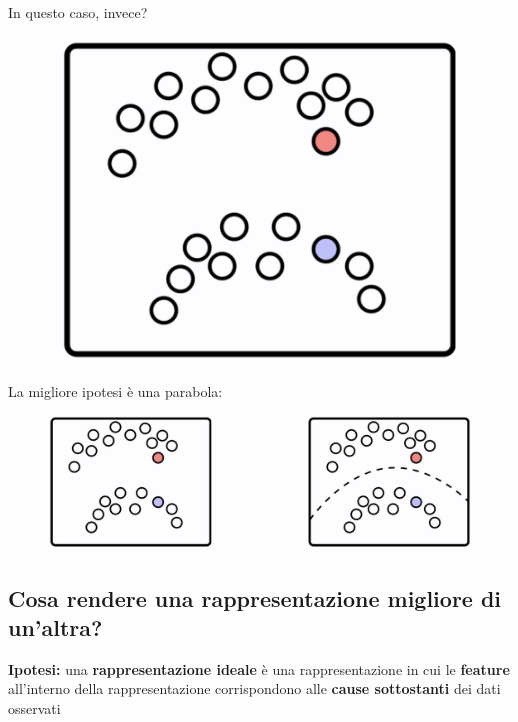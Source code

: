 In questo caso, invece?
\begin{figure}[!h]
  \includegraphics[scale=.3]{images/representation_learning/ssl03.png}
  \centering
\end{figure}


La migliore ipotesi è una parabola:
\begin{figure}[!h]
  \includegraphics[scale=.3]{images/representation_learning/ssl04.png}
  \centering
\end{figure}
\newpage
\subsection{Cosa rendere una rappresentazione migliore di un'altra?}
\textbf{Ipotesi:} una \textbf{rappresentazione ideale} è una rappresentazione in cui le \textbf{feature}
all'interno della rappresentazione corrispondono alle \textbf{cause sottostanti} dei dati osservati


